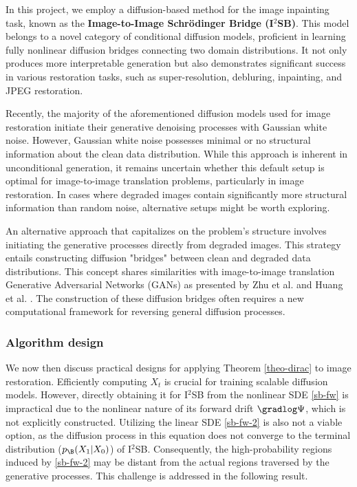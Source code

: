 In this project, we employ a diffusion-based method for the image inpainting task, known as the \textbf{Image-to-Image Schrödinger Bridge (I$^2$SB)}. This model belongs to a novel category of conditional diffusion models, proficient in learning fully nonlinear diffusion bridges connecting two domain distributions. It not only produces more interpretable generation but also demonstrates significant success in various restoration tasks, such as super-resolution, debluring, inpainting, and JPEG restoration.

Recently, the majority of the aforementioned diffusion models used for image restoration initiate their generative denoising processes with Gaussian white noise. However, Gaussian white noise possesses minimal or no structural information about the clean data distribution. While this approach is inherent in unconditional generation, it remains uncertain whether this default setup is optimal for image-to-image translation problems, particularly in image restoration. In cases where degraded images contain significantly more structural information than random noise, alternative setups might be worth exploring.

An alternative approach that capitalizes on the problem's structure involves initiating the generative processes directly from degraded images. This strategy entails constructing diffusion "bridges" between clean and degraded data distributions. This concept shares similarities with image-to-image translation Generative Adversarial Networks (GANs) as presented by Zhu et al. \cite{zhu2017unpaired} and Huang et al. \cite{huang2018multimodal}. The construction of these diffusion bridges often requires a new computational framework for reversing general diffusion processes.

\subsubsection*{Algorithm design}

We now then discuss practical designs for applying Theorem \ref{theo-dirac} to image restoration. Efficiently computing $X_t$ is crucial for training scalable diffusion models. However, directly obtaining it for I$^2$SB from the nonlinear SDE \ref{sb-fw} is impractical due to the nonlinear nature of its forward drift $\gradlog \Psi$, which is not explicitly constructed. Utilizing the linear SDE \ref{sb-fw-2} is also not a viable option, as the diffusion process in this equation does not converge to the terminal distribution ($p_\B(X_1|X_0)$) of I$^2$SB. Consequently, the high-probability regions induced by \ref{sb-fw-2} may be distant from the actual regions traversed by the generative processes. This challenge is addressed in the following result.

